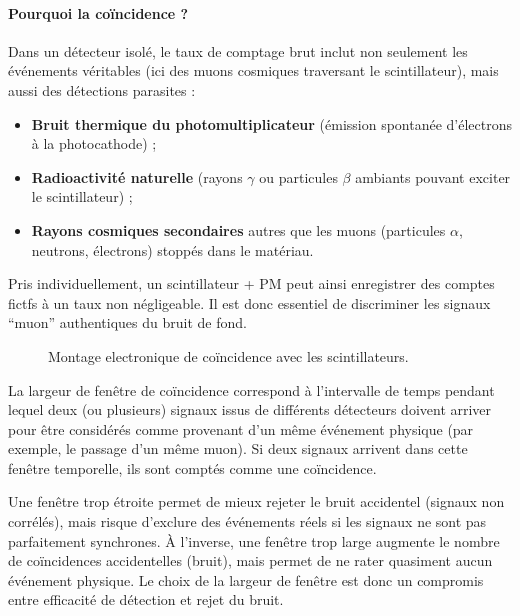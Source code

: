 \documentclass[a4paper,12pt,twoside]{article}
\begin{document}
\paragraph{Pourquoi la coïncidence ?}

Dans un détecteur isolé, le taux de comptage brut inclut non seulement les événements véritables (ici des muons cosmiques traversant le scintillateur), mais aussi des détections parasites :
\begin{itemize}
    \item \textbf{Bruit thermique du photomultiplicateur} (émission spontanée d’électrons à la photocathode) ;
    \item \textbf{Radioactivité naturelle} (rayons $\gamma$ ou particules $\beta$ ambiants pouvant exciter le scintillateur) ;
    \item \textbf{Rayons cosmiques secondaires} autres que les muons (particules $\alpha$, neutrons, électrons) stoppés dans le matériau.
\end{itemize}

Pris individuellement, un scintillateur + PM peut ainsi enregistrer des comptes fictfs à un taux non négligeable.
 Il est donc essentiel de discriminer les signaux “muon” authentiques du bruit de fond.

\begin{figure}[H]
    \centering
    
    \caption{Montage electronique de coïncidence avec les scintillateurs.}
    \label{fig:coincidence_sans_delais}
\end{figure}


La largeur de fenêtre de coïncidence correspond à l'intervalle de temps pendant lequel deux (ou plusieurs) signaux issus de différents détecteurs doivent arriver pour être considérés comme provenant d'un même événement physique (par exemple, le passage d'un même muon). Si deux signaux arrivent dans cette fenêtre temporelle, ils sont comptés comme une coïncidence. 

Une fenêtre trop étroite permet de mieux rejeter le bruit accidentel (signaux non corrélés), mais risque d'exclure des événements réels si les signaux ne sont pas parfaitement synchrones. À l'inverse, une fenêtre trop large augmente le nombre de coïncidences accidentelles (bruit), mais permet de ne rater quasiment aucun événement physique. Le choix de la largeur de fenêtre est donc un compromis entre efficacité de détection et rejet du bruit.
\end{document}
